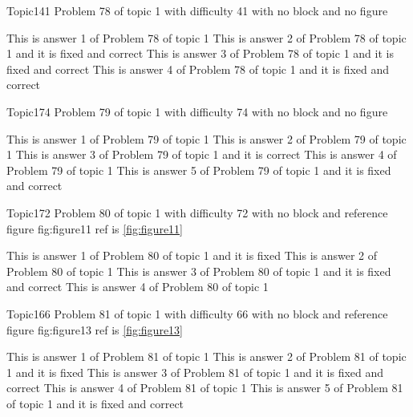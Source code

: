 \documentclass[master]{exam}
\begin{document}
\begin{problem}{Topic1}{41}
	Problem 78 of topic 1 with difficulty 41 with no block and no figure
	\begin{answers}
		\answer This is answer 1 of Problem 78 of topic 1 
		 This is answer 2 of Problem 78 of topic 1 and it is fixed and correct
		 This is answer 3 of Problem 78 of topic 1 and it is fixed and correct
		 This is answer 4 of Problem 78 of topic 1 and it is fixed and correct
	\end{answers}
\end{problem}

\begin{problem}{Topic1}{74}
	Problem 79 of topic 1 with difficulty 74 with no block and no figure
	\begin{answers}
		\answer This is answer 1 of Problem 79 of topic 1 
		\answer This is answer 2 of Problem 79 of topic 1 
		\answer[correct] This is answer 3 of Problem 79 of topic 1 and it is correct
		\answer This is answer 4 of Problem 79 of topic 1 
		 This is answer 5 of Problem 79 of topic 1 and it is fixed and correct
	\end{answers}
\end{problem}

\begin{problem}{Topic1}{72}
	Problem 80 of topic 1 with difficulty 72 with no block and reference figure fig:figure11 ref is \ref{fig:figure11}
	\begin{answers}
		\answer[fixed] This is answer 1 of Problem 80 of topic 1 and it is fixed
		\answer This is answer 2 of Problem 80 of topic 1 
		 This is answer 3 of Problem 80 of topic 1 and it is fixed and correct
		\answer This is answer 4 of Problem 80 of topic 1 
	\end{answers}
\end{problem}

\begin{problem}{Topic1}{66}
	Problem 81 of topic 1 with difficulty 66 with no block and reference figure fig:figure13 ref is \ref{fig:figure13}
	\begin{answers}
		\answer This is answer 1 of Problem 81 of topic 1 
		\answer[fixed] This is answer 2 of Problem 81 of topic 1 and it is fixed
		 This is answer 3 of Problem 81 of topic 1 and it is fixed and correct
		\answer This is answer 4 of Problem 81 of topic 1 
		 This is answer 5 of Problem 81 of topic 1 and it is fixed and correct
	\end{answers}
\end{problem}
\end{document}
